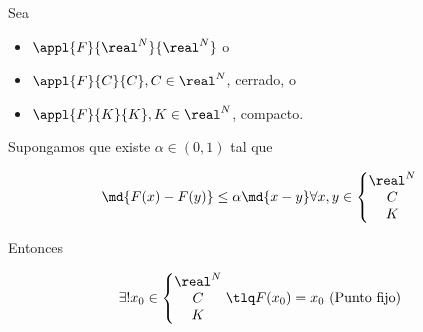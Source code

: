 \begin{theorem} Sea
\begin{itemize}
\item $\appl{F}{\real^N}{\real^N}$ o
\item $\appl{F}{C}{C}, C\in \real^N$, cerrado, o
\item $\appl{F}{K}{K}, K\in \real^N$, compacto.
\end{itemize}

Supongamos que existe $\alpha\in(0,1)$ tal que

\[ \md{F(x)-F(y)}\leq \alpha\md{x-y} \forall x,y \in \left\{\begin{matrix}
                                                           \real^N\\
                                                           C\\
                                                           K
                                                          \end{matrix}\right.
                                              \]

  Entonces

\[  \exists ! x_0 \in\left\{\begin{matrix}         \real^N\\
                                                           C\\
                                                           K
                                                          \end{matrix}\right.
                                                        \tlq F(x_0) = x_0 \text{ (Punto fijo)} \]
\label{thmAC}
\end{theorem}


